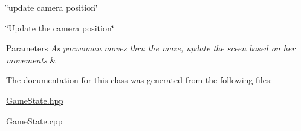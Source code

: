 \char`\"{}update camera position\char`\"{} 

\char`\"{}\+Update the camera position\char`\"{}


\begin{DoxyParams}{Parameters}
{\em As pacwoman moves thru the maze, update the sceen based on her movements} & \\
\hline
\end{DoxyParams}


The documentation for this class was generated from the following files\+:\begin{DoxyCompactItemize}
\item 
\hyperlink{GameState_8hpp}{Game\+State.\+hpp}\item 
Game\+State.\+cpp\end{DoxyCompactItemize}

